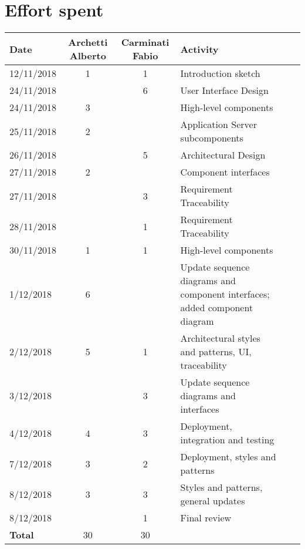 \documentclass[../DD0.tex]{subfiles}
\newcommand{\addHours}[4]{#1 & #2 & #3 & #4 \\\hline}
\begin{document}
\section*{Effort spent}
\label{sec:effort}
  \begin{table}[h!]
  \centering
  \begin{tabularx}{\linewidth}{|l|c|c|X|Xl}
    \hline
    \textbf{Date}  & \textbf{Archetti Alberto} & \textbf{Carminati Fabio} & \textbf{Activity} \\ \hline

    \addHours{12/11/2018}{1}{1}{Introduction sketch}

    \addHours{24/11/2018}{}{6}{User Interface Design}

    \addHours{24/11/2018}{3}{}{High-level components}

    \addHours{25/11/2018}{2}{}{Application Server subcomponents}

    \addHours{26/11/2018}{}{5}{Architectural Design}

    \addHours{27/11/2018}{2}{}{Component interfaces}

    \addHours{27/11/2018}{}{3}{Requirement Traceability}

    \addHours{28/11/2018}{}{1}{Requirement Traceability}

    \addHours{30/11/2018}{1}{1}{High-level components}

    \addHours{1/12/2018}{6}{}{Update sequence diagrams and component interfaces; added component diagram}

    \addHours{2/12/2018}{5}{1}{Architectural styles and patterns, UI, traceability}

    \addHours{3/12/2018}{}{3}{Update sequence diagrams and interfaces}

    \addHours{4/12/2018}{4}{3}{Deployment, integration and testing}

    \addHours{7/12/2018}{3}{2}{Deployment, styles and patterns}

    \addHours{8/12/2018}{3}{3}{Styles and patterns, general updates}

    \addHours{8/12/2018}{}{1}{Final review}

    \addHours{\textbf{Total}}{30}{30}{}
    
  \end{tabularx}
\end{table}
\end{document}
